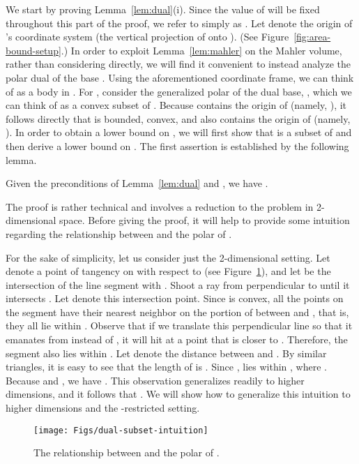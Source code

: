\documentclass[11pt]{article}   \usepackage[letterpaper,hmargin=2.1cm,vmargin=3cm]{geometry}
\begin{document}
We start by proving Lemma~\ref{lem:dual}(i). Since the value of  will be fixed throughout this part of the proof, we refer to  simply as . Let  denote the origin of 's coordinate system (the vertical projection of  onto ). (See Figure~\ref{fig:area-bound-setup}.) In order to exploit Lemma~\ref{lem:mahler} on the Mahler volume, rather than considering  directly, we will find it convenient to instead analyze the polar dual of the base . Using the aforementioned coordinate frame, we can think of  as a body in . For , consider the generalized polar of the dual base, , which we can think of as a convex subset of . Because  contains the origin of  (namely, ), it follows directly that  is bounded, convex, and also contains the origin of  (namely, ). In order to obtain a lower bound on , we will first show that  is a subset of  and then derive a lower bound on . The first assertion is established by the following lemma.

\begin{lemma} \label{lem:dual-subset}
Given the preconditions of Lemma~\ref{lem:dual} and , we have .
\end{lemma}


The proof is rather technical and involves a reduction to the problem in 2-dimensional space. Before giving the proof, it will help to provide some intuition regarding the relationship between  and the polar of . 

For the sake of simplicity, let us consider just the 2-dimensional setting. Let  denote a point of tangency on  with respect to  (see Figure~\ref{fig:dual-subset-intuition}), and let  be the intersection of the line segment  with . Shoot a ray from  perpendicular to  until it intersects . Let  denote this intersection point. Since  is convex, all the points on the segment  have their nearest neighbor on the portion of  between  and , that is, they all lie within . Observe that if we translate this perpendicular line so that it emanates from  instead of , it will hit  at a point  that is closer to . Therefore, the segment  also lies within . Let  denote the distance between  and . By similar triangles, it is easy to see that the length of  is . Since ,  lies within , where . Because  and , we have . This observation generalizes readily to higher dimensions, and it follows that . We will show how to generalize this intuition to higher dimensions and the -restricted setting.

\begin{figure}[htbp]
  \centerline{\texttt{[image: Figs/dual-subset-intuition]}}
  \caption{The relationship between  and the polar of .}
  \label{fig:dual-subset-intuition}
\end{figure}
\end{document}
